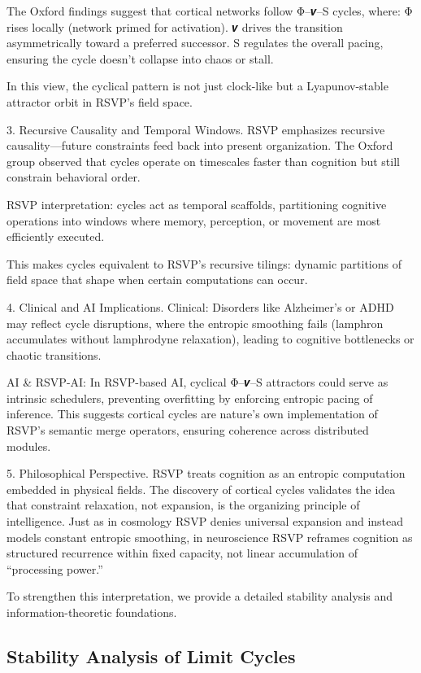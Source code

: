 \documentclass{article}
\begin{document}
The Oxford findings suggest that cortical networks follow Φ–𝒗–S cycles, where: Φ rises locally (network primed for activation). 𝒗 drives the transition asymmetrically toward a preferred successor. S regulates the overall pacing, ensuring the cycle doesn’t collapse into chaos or stall.

In this view, the cyclical pattern is not just clock-like but a Lyapunov-stable attractor orbit in RSVP’s field space.

3. Recursive Causality and Temporal Windows. RSVP emphasizes recursive causality—future constraints feed back into present organization. The Oxford group observed that cycles operate on timescales faster than cognition but still constrain behavioral order.

RSVP interpretation: cycles act as temporal scaffolds, partitioning cognitive operations into windows where memory, perception, or movement are most efficiently executed.

This makes cycles equivalent to RSVP’s recursive tilings: dynamic partitions of field space that shape when certain computations can occur.

4. Clinical and AI Implications. Clinical: Disorders like Alzheimer’s or ADHD may reflect cycle disruptions, where the entropic smoothing fails (lamphron accumulates without lamphrodyne relaxation), leading to cognitive bottlenecks or chaotic transitions.

AI \& RSVP-AI: In RSVP-based AI, cyclical Φ–𝒗–S attractors could serve as intrinsic schedulers, preventing overfitting by enforcing entropic pacing of inference. This suggests cortical cycles are nature’s own implementation of RSVP’s semantic merge operators, ensuring coherence across distributed modules.

5. Philosophical Perspective. RSVP treats cognition as an entropic computation embedded in physical fields. The discovery of cortical cycles validates the idea that constraint relaxation, not expansion, is the organizing principle of intelligence. Just as in cosmology RSVP denies universal expansion and instead models constant entropic smoothing, in neuroscience RSVP reframes cognition as structured recurrence within fixed capacity, not linear accumulation of “processing power.”

To strengthen this interpretation, we provide a detailed stability analysis and information-theoretic foundations.
\subsection{Stability Analysis of Limit Cycles}
\end{document}
